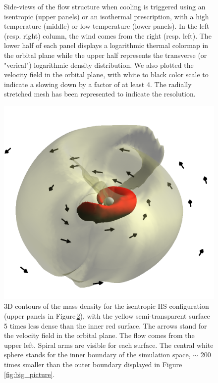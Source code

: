 \documentclass{aa}
\begin{document}
\begin{figure}
\begin{subfigure}{0.5\textwidth}
\begin{center}
\label{fig:subim2}
\end{center}
\end{subfigure}
\caption{Side-views of the flow structure when cooling is triggered using an isentropic (upper panels) or an isothermal prescription, with a high temperature (middle) or low temperature (lower panels). In the left (resp. right) column, the wind comes from the right (resp. left). The lower half of each panel displays a logarithmic thermal colormap in the orbital plane while the upper half represents the transverse (or "verical") logarithmic density distribution. We also plotted the velocity field in the orbital plane, with white to black color scale to indicate a slowing down by a factor of at least 4. The radially stretched mesh has been represented to indicate the resolution.}
\label{fig:cooled_ones}
\end{figure}

\begin{figure}
\centering
\includegraphics[width=0.95\columnwidth]{Pictures/disc.png}
\caption{3D contours of the mass density for the isentropic HS configuration (upper panels in Figure\,\ref{fig:cooled_ones}), with the yellow semi-transparent surface 5 times less dense than the inner red surface. The arrows stand for the velocity field in the orbital plane. The flow comes from the upper left. Spiral arms are visible for each surface. The central white sphere stands for the inner boundary of the simulation space, $\sim$ 200 times smaller than the outer boundary displayed in Figure\,\ref{fig:big_picture}.}
\label{fig:disc}
\end{figure} 
\end{document}
